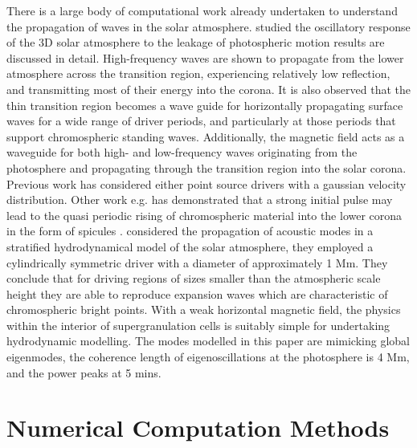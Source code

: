 \documentclass[preprint,authoryear,12pt]{elsarticle}
\begin{document}
There is a large body of computational work already undertaken to understand the propagation of waves in the solar atmosphere.\citet{Fedun2009} studied the oscillatory response of the 3D solar atmosphere to the leakage of photospheric motion results are discussed in detail. High-frequency waves are shown to propagate from the lower atmosphere across the transition region, experiencing relatively low reflection, and transmitting most of their energy into the corona. It is also observed that the thin transition region becomes a wave guide for horizontally propagating surface waves for a wide range of driver periods, and particularly at those periods that support chromospheric standing waves. Additionally, the magnetic field acts as a waveguide for both high- and low-frequency waves originating from the photosphere and propagating through the transition region into the solar corona. Previous work has considered either point source drivers with a gaussian velocity distribution. Other work e.g.  \citet{Murawski2010} has demonstrated that a strong initial pulse may lead to the quasi periodic rising of chromospheric material into the lower corona in the form of spicules \citet{Khomenko2013}. \citet{Kalkofen2010} considered the propagation of acoustic modes in a stratified hydrodynamical model of the solar atmosphere, they employed a cylindrically symmetric driver with a diameter of approximately 1 Mm. They conclude that for driving regions of sizes smaller than the atmospheric scale height they are able to reproduce expansion waves which are characteristic of chromospheric bright points. With a weak horizontal magnetic field, the physics within the interior of supergranulation cells \citet{Lites2008} is suitably simple for undertaking hydrodynamic modelling. The modes modelled in this paper are mimicking global eigenmodes, the coherence length of eigenoscillations at the photosphere is 4 Mm, and the power peaks at 5 mins. 

\section{Numerical Computation Methods}
\end{document}
